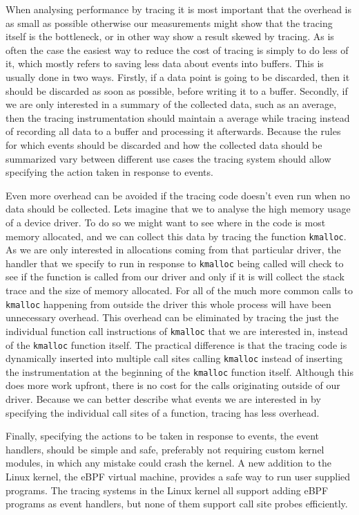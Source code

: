 \documentclass[12pt,twoside,notitlepage]{report}
\begin{document}
        When analysing performance by tracing it is most important that the overhead is as small as possible otherwise our measurements might show that the tracing itself is the bottleneck, or in other way show a result skewed by tracing. As is often the case the easiest way to reduce the cost of tracing is simply to do less of it, which mostly refers to saving less data about events into buffers. This is usually done in two ways. Firstly, if a data point is going to be discarded, then it should be discarded as soon as possible, before writing it to a buffer. Secondly, if we are only interested in a summary of the collected data, such as an average, then the tracing instrumentation should maintain a average while tracing instead of recording all data to a buffer and processing it afterwards. Because the rules for which events should be discarded and how the collected data should be summarized vary between different use cases the tracing system should allow specifying the action taken in response to events.

		Even more overhead can be avoided if the tracing code doesn't even run when no data should be collected. Lets imagine that we to analyse the high memory usage of a device driver. To do so we might want to see where in the code is most memory allocated, and we can collect this data by tracing the function \texttt{kmalloc}. As we are only interested in allocations coming from that particular driver, the handler that we specify to run in response to \texttt{kmalloc} being called will check to see if the function is called from our driver and only if it is will collect the stack trace and the size of memory allocated. For all of the much more common calls to \texttt{kmalloc} happening from outside the driver this whole process will have been unnecessary overhead. This overhead can be eliminated by tracing the just the individual function call instructions of \texttt{kmalloc} that we are interested in, instead of the \texttt{kmalloc} function itself. The practical difference is that the tracing code is dynamically inserted into multiple call sites calling \texttt{kmalloc} instead of inserting the instrumentation at the beginning of the \texttt{kmalloc} function itself. Although this does more work upfront, there is no cost for the calls originating outside of our driver. Because we can better describe what events we are interested in by specifying the individual call sites of a function, tracing has less overhead.

		Finally, specifying the actions to be taken in response to events, the event handlers, should be simple and safe, preferably not requiring custom kernel modules, in which any mistake could crash the kernel. A new addition to the Linux kernel, the eBPF virtual machine, provides a safe way to run user supplied programs. The tracing systems in the Linux kernel all support adding eBPF programs as event handlers, but none of them support call site probes efficiently.
\end{document}
